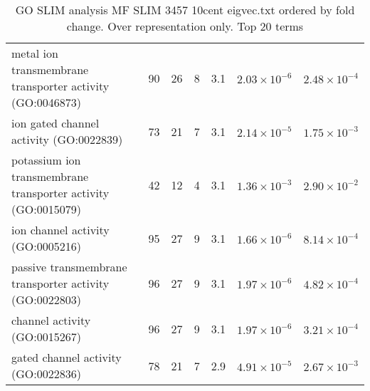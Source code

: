 \begin{table}[ht]
\begin{adjustbox}{width=\textwidth}
\begin{tabular}{lrrrrrr}
  metal ion transmembrane transporter activity (GO:0046873) & 90 & 26 & 8 & 3.1 & $2.03 \times 10^{-6}$ & $2.48 \times 10^{-4}$ \\ 
  ion gated channel activity (GO:0022839) & 73 & 21 & 7 & 3.1 & $2.14 \times 10^{-5}$ & $1.75 \times 10^{-3}$ \\ 
  potassium ion transmembrane transporter activity (GO:0015079) & 42 & 12 & 4 & 3.1 & $1.36 \times 10^{-3}$ & $2.90 \times 10^{-2}$ \\ 
  ion channel activity (GO:0005216) & 95 & 27 & 9 & 3.1 & $1.66 \times 10^{-6}$ & $8.14 \times 10^{-4}$ \\ 
  passive transmembrane transporter activity (GO:0022803) & 96 & 27 & 9 & 3.1 & $1.97 \times 10^{-6}$ & $4.82 \times 10^{-4}$ \\ 
  channel activity (GO:0015267) & 96 & 27 & 9 & 3.1 & $1.97 \times 10^{-6}$ & $3.21 \times 10^{-4}$ \\ 
  gated channel activity (GO:0022836) & 78 & 21 & 7 & 2.9 & $4.91 \times 10^{-5}$ & $2.67 \times 10^{-3}$ \\ 
   \hline
\end{tabular}
\end{adjustbox}
\caption{GO SLIM analysis MF SLIM 3457 10cent eigvec.txt ordered by fold change. Over representation only. Top 20 terms} 
\label{tab:GO SLIM analysis MF SLIM 3457 10cent eigvec.txt ordered by fold change. Over representation only. Top 20 terms}
\end{table}


